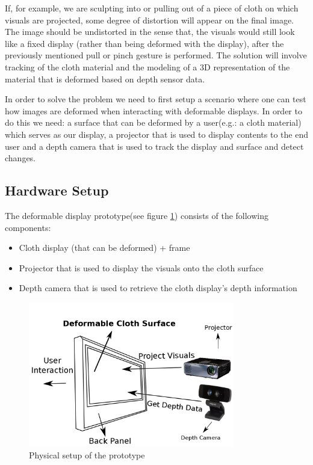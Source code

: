 \documentclass[]{article}
\begin{document}
If, for example, we are sculpting into or pulling out of a piece of cloth on which visuals are projected, some degree of distortion will appear on the final image. 
The image should be undistorted in the sense that, the visuals would still look like a fixed display (rather than being deformed with the display), after the previously mentioned pull or pinch gesture is performed. The solution will involve tracking of the cloth material and the modeling of a 3D representation of the material that is deformed based on depth sensor data.

In order to solve the problem we need to first setup a scenario where one can test how images are deformed when interacting with deformable displays. In order to do this we need: a surface that can be deformed by a user(e.g.: a cloth material) which serves as our display, a projector that is used to display contents to the end user and a depth camera that is used to track the display and surface and detect changes.

\subsection{Hardware Setup}

The deformable display prototype(see figure \ref{fig:hardware_setup}) consists of the following components:
\begin{itemize}
\item Cloth display (that can be deformed) + frame
\item Projector that is used to display the visuals onto the cloth surface
\item Depth camera that is used to retrieve the cloth display’s depth information
\end{itemize}

\begin{figure}[hbtp]
    \centering
    \includegraphics[width=0.8\textwidth]{figures/thesis_setup_illustration_ui.png}
    \caption{Physical setup of the prototype}
    \label{fig:hardware_setup}
\end{figure}
\newpage
\end{document}
